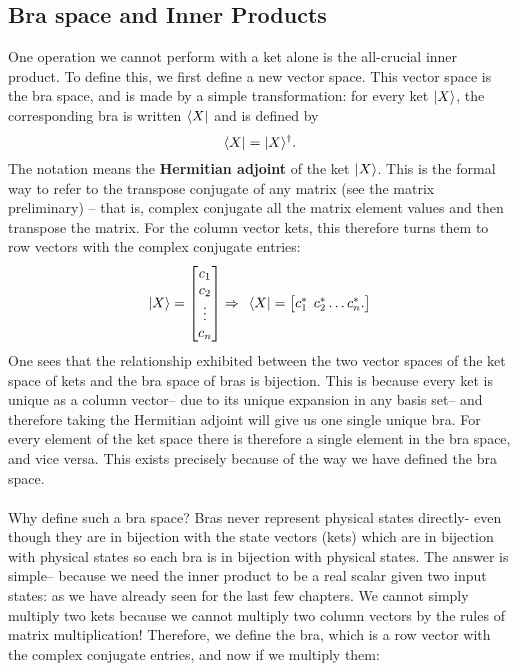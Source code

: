\subsection{Bra space and Inner Products}
One operation we cannot perform with a ket alone is the all-crucial inner product. To define this, we first define a new vector space. This vector space is the bra space, and is made by a simple transformation: for every ket $|X\rangle$, the corresponding bra is written $\langle X|$ and is defined by
$$
\langle X|=|X\rangle^{\dagger}.
$$
The  notation means the \textbf{Hermitian adjoint} of the ket $|X\rangle$. This is the formal way to refer to the transpose conjugate of any matrix (see the matrix preliminary) -- that is, complex conjugate all the matrix element values and then transpose the matrix. For the column vector kets, this therefore turns them to row vectors with the complex conjugate entries:
$$
|X\rangle=\begin{bmatrix}
c_{1}\\
c_{2}\\
\vdots\\
c_{n}\\
\end{bmatrix}\Rightarrow\:\:\langle X|=\begin{bmatrix}
c^{\ast}_{1}\:\: c^{\ast}_{2} \dots c^{\ast}_{n}.
\end{bmatrix}
$$
One sees that the relationship exhibited between the two vector spaces of the ket space of kets and the bra space of bras is bijection. This is because every ket is unique as a column vector-- due to its unique expansion in any basis set-- and therefore taking the Hermitian adjoint will give us one single unique bra. For every element of the ket space there is therefore a single element in the bra space, and vice versa. This exists precisely because of the way we have defined the bra space.
\\\\
Why define such a bra space? Bras never represent physical states directly- even though they are in bijection with the state vectors (kets) which are in bijection with physical states so each bra is in bijection with physical states. The answer is simple-- because we need the inner product to be a real scalar given two input states: as we have already seen for the last few chapters. We cannot simply multiply two kets because we cannot multiply two column vectors by the rules of matrix multiplication! Therefore, we define the bra, which is a row vector with the complex conjugate entries, and now if we multiply them:

